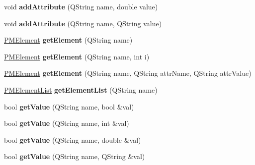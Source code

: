 \begin{DoxyCompactItemize}
\item 
\hypertarget{classPMElement_a1f5a9f2813c475d50c0641f02218db73}{
void {\bfseries addAttribute} (QString name, double value)}
\label{classPMElement_a1f5a9f2813c475d50c0641f02218db73}

\item 
\hypertarget{classPMElement_ab02a2810666cc0644c370fe1cfa11533}{
void {\bfseries addAttribute} (QString name, QString value)}
\label{classPMElement_ab02a2810666cc0644c370fe1cfa11533}

\item 
\hypertarget{classPMElement_a9f8063f859988f5e93029a1d21f8882d}{
\hyperlink{classPMElement}{PMElement} {\bfseries getElement} (QString name)}
\label{classPMElement_a9f8063f859988f5e93029a1d21f8882d}

\item 
\hypertarget{classPMElement_a50e6b700a78be12a0ecd6e05af4880f3}{
\hyperlink{classPMElement}{PMElement} {\bfseries getElement} (QString name, int i)}
\label{classPMElement_a50e6b700a78be12a0ecd6e05af4880f3}

\item 
\hypertarget{classPMElement_affd4449d5a7fb0343a01b02c3026186a}{
\hyperlink{classPMElement}{PMElement} {\bfseries getElement} (QString name, QString attrName, QString attrValue)}
\label{classPMElement_affd4449d5a7fb0343a01b02c3026186a}

\item 
\hypertarget{classPMElement_a36440721ff4961e057adbee6dbe02a2e}{
\hyperlink{classPMElementList}{PMElementList} {\bfseries getElementList} (QString name)}
\label{classPMElement_a36440721ff4961e057adbee6dbe02a2e}

\item 
\hypertarget{classPMElement_ab181ab8d8db6e40dcc4d056deb637395}{
bool {\bfseries getValue} (QString name, bool \&val)}
\label{classPMElement_ab181ab8d8db6e40dcc4d056deb637395}

\item 
\hypertarget{classPMElement_a366d41cdb0194c6203cb66d06b03b93c}{
bool {\bfseries getValue} (QString name, int \&val)}
\label{classPMElement_a366d41cdb0194c6203cb66d06b03b93c}

\item 
\hypertarget{classPMElement_aaa0e58c65c9756abb0c330f069c56c4f}{
bool {\bfseries getValue} (QString name, double \&val)}
\label{classPMElement_aaa0e58c65c9756abb0c330f069c56c4f}

\item 
\hypertarget{classPMElement_ae39a1d735cceb85d71fadb4afa63be02}{
bool {\bfseries getValue} (QString name, QString \&val)}
\label{classPMElement_ae39a1d735cceb85d71fadb4afa63be02}


\end{DoxyCompactItemize}
